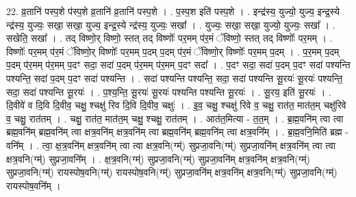 \documentclass[17pt]{extarticle}
\begin{document}
22. व्र॒तानि॑ पस्प॒शे प॑स्प॒शे व्र॒तानि॑ व्र॒तानि॑ पस्प॒शे । . प॒स्प॒श इति॑ पस्प॒शे । . इन्द्र॑स्य॒ युज्यो॒ युज्य॒ इन्द्र॒स्ये न्द्र॑स्य॒ युज्यः॒ सखा॒ सखा॒ युज्य॒ इन्द्र॒स्ये न्द्र॑स्य॒ युज्यः॒ सखा᳚ । . युज्यः॒ सखा॒ सखा॒ युज्यो॒ युज्यः॒ सखा᳚ । . सखेति॒ सखा᳚ । . तद् विष्णो॒र् विष्णो॒ स्तत् तद् विष्णोः᳚ पर॒मम् प॑र॒मं ॅविष्णो॒ स्तत् तद् विष्णोः᳚ पर॒मम् । . विष्णोः᳚ पर॒मम् प॑र॒मं ॅविष्णो॒र् विष्णोः᳚ पर॒मम् प॒दम् प॒दम् प॑र॒मं ॅविष्णो॒र् विष्णोः᳚ पर॒मम् प॒दम् । . प॒र॒मम् प॒दम् प॒दम् प॑र॒मम् प॑र॒मम् प॒दꣳ सदा॒ सदा॑ प॒दम् प॑र॒मम् प॑र॒मम् प॒दꣳ सदा᳚ । . प॒दꣳ सदा॒ सदा॑ प॒दम् प॒दꣳ सदा॑ पश्यन्ति पश्यन्ति॒ सदा॑ प॒दम् प॒दꣳ सदा॑ पश्यन्ति । . सदा॑ पश्यन्ति पश्यन्ति॒ सदा॒ सदा॑ पश्यन्ति सू॒रयः॑ सू॒रयः॑ पश्यन्ति॒ सदा॒ सदा॑ पश्यन्ति सू॒रयः॑ । . प॒श्य॒न्ति॒ सू॒रयः॑ सू॒रयः॑ पश्यन्ति पश्यन्ति सू॒रयः॑ । . सू॒रय॒ इति॑ सू॒रयः॑ । . दि॒वीवे॑ व दि॒वि दि॒वीव॒ चक्षु॒ श्चक्षु॑ रिव दि॒वि दि॒वीव॒ चक्षुः॑ । . इ॒व॒ चक्षु॒ श्चक्षु॑ रिवे व॒ चक्षु॒ रात॑त॒ मात॑त॒म् चक्षु॑रिवे व॒ चक्षु॒ रात॑तम् । . चक्षु॒ रात॑त॒ मात॑त॒म् चक्षु॒ श्चक्षु॒ रात॑तम् । . आत॑त॒मित्या - त॒त॒म् । . ब्र॒ह्म॒वनि॑म् त्वा त्वा ब्रह्म॒वनि॑म् ब्रह्म॒वनि॑म् त्वा क्षत्र॒वनि॑म् क्षत्र॒वनि॑म् त्वा ब्रह्म॒वनि॑म् ब्रह्म॒वनि॑म् त्वा क्षत्र॒वनि᳚म् । . ब्र॒ह्म॒वनि॒मिति॑ ब्रह्म - वनि᳚म् । . त्वा॒ क्ष॒त्र॒वनि॑म् क्षत्र॒वनि॑म् त्वा त्वा क्षत्र॒वनि(ग्म्॑) सुप्रजा॒वनि(ग्म्॑) सुप्रजा॒वनि॑म् क्षत्र॒वनि॑म् त्वा त्वा क्षत्र॒वनि(ग्म्॑) सुप्रजा॒वनि᳚म् । . क्ष॒त्र॒वनि(ग्म्॑) सुप्रजा॒वनि(ग्म्॑) सुप्रजा॒वनि॑म् क्षत्र॒वनि॑म् क्षत्र॒वनि(ग्म्॑) सुप्रजा॒वनि(ग्म्॑) रायस्पोष॒वनि(ग्म्॑) रायस्पोष॒वनि(ग्म्॑) सुप्रजा॒वनि॑म् क्षत्र॒वनि॑म् क्षत्र॒वनि(ग्म्॑) सुप्रजा॒वनि(ग्म्॑) रायस्पोष॒वनि᳚म् । \newline
\end{document}
